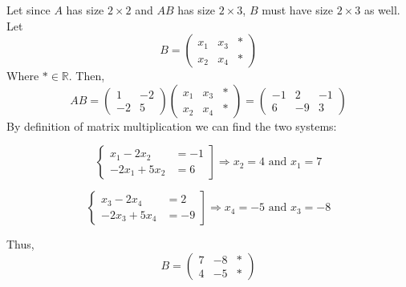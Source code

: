\documentclass{exam}
\newcommand{\RR}{\mathbb R}
\begin{document}
\begin{solution}
    Let since $A$ has size $2 \times 2$ and $AB$ has size $2 \times 3$, $B$ must have size $2 \times 3$ as well. Let
    \[B = \begin{pmatrix}
        x_1 & x_3 & * \\ x_2 & x_4 & *
    \end{pmatrix}\]
    Where $*\in\RR$. Then, 
    \[
        AB =  
        \begin{pmatrix}
            1 & -2 \\ -2 & 5
        \end{pmatrix}
        \begin{pmatrix}
            x_1 & x_3 & * \\ x_2 & x_4 & *
        \end{pmatrix}
        =
        \begin{pmatrix}
            -1 & 2 & -1 \\
            6 & -9 & 3
        \end{pmatrix}
    \]
    By definition of matrix multiplication we can find the two systems: \\
    \begin{minipage}{0.47\linewidth}
        \[
            \left.\begin{cases}
                x_1 - 2x_2 &= -1 \\
                -2x_1 + 5x_2 &= 6
            \end{cases}\right] 
            \Rightarrow
            x_2 = 4 \text{ and } x_1 = 7
        \]        
    \end{minipage}
    \hfill
    \begin{minipage}{0.47\linewidth}
        \[
            \left.\begin{cases}
                x_3 - 2x_4 &= 2 \\
                -2x_3 + 5x_4 &= -9
            \end{cases}\right]
            \Rightarrow 
            x_4 = -5 \text{ and } x_3 = -8
        \]
    \end{minipage}
    Thus, 
    \[\boxed{B = \begin{pmatrix}
        7 & -8 & * \\
        4 & -5 & *
    \end{pmatrix}}\]
\end{solution}
\end{document}
